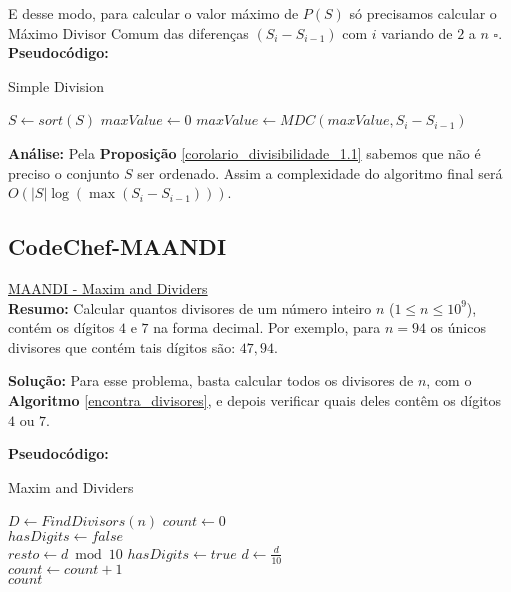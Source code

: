 E desse modo, para calcular o valor máximo de $P(S)$ só precisamos calcular o Máximo Divisor Comum das diferenças $(S_i-S_{i-1})$ com $i$ variando de $2$ a $n$ $\square$.
\\

\textbf{Pseudocódigo:}
\begin{algorithm}
\caption{Simple Division}\label{euclid}
\begin{algorithmic}[1]
\State $S \gets sort(S)$  
\State $maxValue \gets 0$
\State $maxValue \gets MDC(maxValue, S_i - S_{i-1})$
\EndFor
\State {}
\EndProcedure
\end{algorithmic}
\end{algorithm}

\textbf{Análise:}
Pela \textbf{Proposição} \autoref{corolario_divisibilidade_1.1} sabemos que não é preciso o conjunto $S$ ser ordenado.
Assim a complexidade do algoritmo final será $O(|S|\log (\max (S_i-S_{i-1})))$.



\subsection{CodeChef-MAANDI}
\href{https://www.codechef.com/problems/MAANDI}{MAANDI - Maxim and Dividers}\\

\textbf{Resumo:}
Calcular quantos divisores de um número inteiro $n$ ($1\leq n \leq 10^9$), contém os dígitos $4$ e $7$ na forma decimal.
Por exemplo, para $n=94$ os únicos divisores que contém tais dígitos são: $47, 94$.
\newline

\textbf{Solução:}
Para esse problema, basta calcular todos os divisores de $n$, com o \textbf{Algoritmo} \autoref{encontra_divisores}, e depois verificar quais deles contêm os dígitos $4$ ou $7$.
\clearpage

\textbf{Pseudocódigo:}
\begin{algorithm}
\caption{Maxim and Dividers}
\begin{algorithmic}[1]
\State $D \gets FindDivisors(n)$ 
\State $count \gets 0$
\\
\State $hasDigits \gets false$
\\
\State $resto \gets d \bmod 10$
\State $hasDigits \gets true$
\EndIf
\State $d \gets \frac{d}{10}$
\EndWhile
\\
\State $count \gets count + 1$
\EndIf
\EndFor
\\
\State \Return $count$

\EndProcedure
\end{algorithmic}
\end{algorithm}


